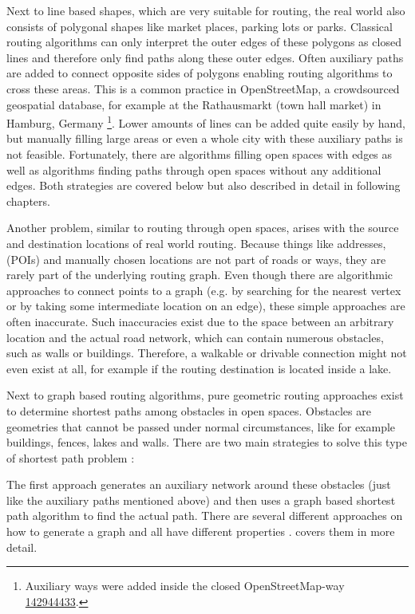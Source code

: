 	Next to line based shapes, which are very suitable for routing, the real world also consists of polygonal shapes like market places, parking lots or parks.
	Classical routing algorithms can only interpret the outer edges of these polygons as closed lines and therefore only find paths along these outer edges.
	Often auxiliary paths are added to connect opposite sides of polygons enabling routing algorithms to cross these areas.
	This is a common practice in OpenStreetMap, a crowdsourced geospatial database, for example at the Rathausmarkt (town hall market) in Hamburg, Germany \footnote{Auxiliary ways were added inside the closed OpenStreetMap-way  \href{https://www.openstreetmap.org/way/142944433}{142944433}.}.
	Lower amounts of lines can be added quite easily by hand, but manually filling large areas or even a whole city with these auxiliary paths is not feasible.
	Fortunately, there are algorithms filling open spaces with edges as well as algorithms finding paths through open spaces without any additional edges.
	Both strategies are covered below but also described in detail in following chapters.
	
	Another problem, similar to routing through open spaces, arises with the source and destination locations of real world routing.
	Because things like addresses,  (POIs) and manually chosen locations are not part of roads or ways, they are rarely part of the underlying routing graph.
	Even though there are algorithmic approaches to connect points to a graph (e.g. by searching for the nearest vertex or by taking some intermediate location on an edge), these simple approaches are often inaccurate.
	Such inaccuracies exist due to the space between an arbitrary location and the actual road network, which can contain numerous obstacles, such as walls or buildings.
	Therefore, a walkable or drivable connection might not even exist at all, for example if the routing destination is located inside a lake.
	
	Next to graph based routing algorithms, pure geometric routing approaches exist to determine shortest paths among obstacles in open spaces.
	Obstacles are geometries that cannot be passed under normal circumstances, like for example buildings, fences, lakes and walls.
	There are two main strategies to solve this type of shortest path problem \cite{hershberger-suri}:
	
	The first approach generates an auxiliary network around these obstacles (just like the auxiliary paths mentioned above) and then uses a graph based shortest path algorithm to find the actual path.
	There are several different approaches on how to generate a graph and all have different properties \cite{graser-osm-open-spaces}.
	 covers them in more detail.
	
